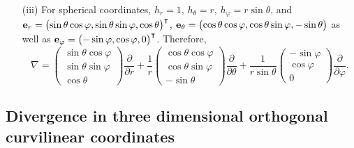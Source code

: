 {\begin{itemize}
\item[(iii)]
For spherical coordinates,
$
h_r=1$,
$
h_\theta=r$,
$
h_\varphi=r\sin \theta$, and
$
{\bf e}_r =
\begin{pmatrix}
\sin \theta \cos \varphi , \sin \theta \sin \varphi,\cos \theta
\end{pmatrix}^\intercal
$, $
{\bf e}_\theta
=
\begin{pmatrix}
\cos \theta \cos \varphi , \cos \theta \sin \varphi,-\sin \theta
\end{pmatrix}$ as well as $
{\bf e}_\varphi
=
\begin{pmatrix}
-\sin \varphi , \cos \varphi ,0
\end{pmatrix}^\intercal  $.
Therefore,
\begin{equation}
\nabla =
\begin{pmatrix}
\sin \theta \cos \varphi \\ \sin \theta \sin \varphi\\ \cos \theta
\end{pmatrix}
\frac{\partial}{\partial r}
+
\frac{ 1 }{ r }
\begin{pmatrix}
\cos \theta \cos \varphi \\ \cos \theta \sin \varphi\\ -\sin \theta
\end{pmatrix}
\frac{\partial}{\partial \theta}
+
\frac{ 1 }{ r \sin \theta}
\begin{pmatrix}
-\sin \varphi \\ \cos \varphi \\0
\end{pmatrix}
\frac{\partial}{\partial \varphi }
.
\end{equation}
\end{itemize}
\eexample
}






\subsection{Divergence in three dimensional orthogonal curvilinear coordinates}

